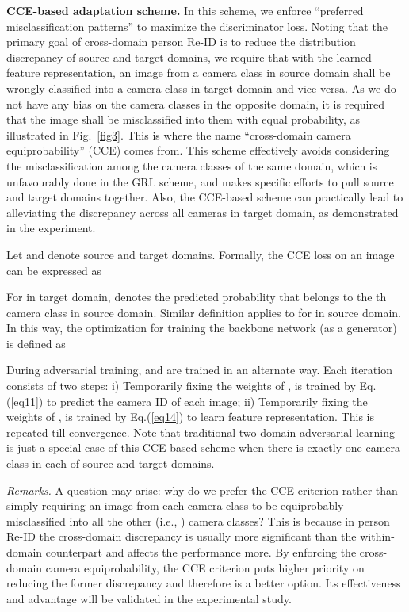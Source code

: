 \documentclass[10pt,twocolumn,letterpaper]{article}
\begin{document}
 
\textbf{CCE-based adaptation scheme.} 
In this scheme, we enforce ``preferred misclassification patterns'' to maximize the discriminator loss. Noting that the primary goal of cross-domain person Re-ID is to reduce the distribution discrepancy of source and target domains, we require that with the learned feature representation, an image from a camera class in source domain shall be wrongly classified into a camera class in target domain and vice versa. 
As we do not have any bias on the camera classes in the opposite domain, it is required that the image shall be misclassified into them with equal probability, as illustrated in Fig.~\ref{fig3}. This is where the name ``cross-domain camera equiprobability'' (CCE) comes from. This scheme effectively avoids considering the misclassification among the camera classes of the same domain, which is unfavourably done in the GRL scheme, and makes specific efforts to pull source and target domains together.
Also, the CCE-based scheme can practically lead to alleviating the discrepancy across all cameras in target domain, as demonstrated in the experiment.




Let  and  denote source and target domains. Formally, the CCE loss on an image  can be expressed as

For  in target domain,  denotes the predicted probability that  belongs to the th camera class in source domain. Similar definition applies to  for  in source domain. In this way, the optimization for training the backbone network  (as a generator) is defined as
 
 
During adversarial training,  and  are trained in an alternate way. Each iteration consists of two steps: i) Temporarily fixing the weights of ,  is trained by Eq.(\ref{eq11}) to predict the camera ID of each image; ii) Temporarily fixing the weights of ,  is trained by Eq.(\ref{eq14}) to learn feature representation. This is repeated till convergence. Note that traditional two-domain adversarial learning~\cite{DBLP:conf/icml/GaninL15,DBLP:conf/cvpr/TzengHSD17} is just a special case of this CCE-based scheme when there is exactly one camera class in each of source and target domains.

\textit{Remarks.} A question may arise: why do we prefer the CCE criterion rather than simply requiring an image from each camera class to be equiprobably misclassified into all the other (i.e., ) camera classes? This is because in person Re-ID the cross-domain discrepancy is usually more significant than the within-domain counterpart and affects the performance more. By enforcing the cross-domain camera equiprobability, the CCE criterion puts higher priority on reducing the former discrepancy and therefore is a better option. Its effectiveness and advantage will be validated in the experimental study.     
 
\end{document}
